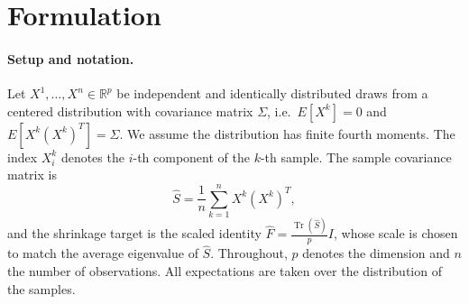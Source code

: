 \documentclass[10pt,twoside,titlepage]{article}
\begin{document}
\section{Formulation}\label{sec-formulation}

\paragraph{Setup and notation.}
Let $X^1, \ldots, X^n \in \mathbb{R}^p$ be independent and identically distributed draws
from a centered distribution with covariance matrix $\Sigma$, i.e.\ $E[X^k] = 0$ and
$E[X^k (X^k)^T] = \Sigma$.
We assume the distribution has finite fourth moments.
The index $X_i^k$ denotes the $i$-th component of the $k$-th sample.
The sample covariance matrix is
\begin{equation*}
\hat{S} = \frac{1}{n} \sum_{k=1}^n X^k (X^k)^T,
\end{equation*}
and the shrinkage target is the scaled identity $\hat{F} = \frac{\operatorname{Tr}(\hat{S})}{p} I$,
whose scale is chosen to match the average eigenvalue of $\hat{S}$.
Throughout, $p$ denotes the dimension and $n$ the number of observations.
All expectations are taken over the distribution of the samples.
\end{document}
